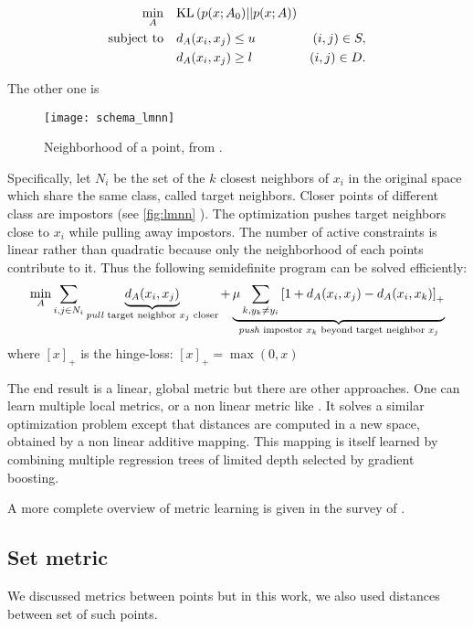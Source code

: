 \begin{align*}
	\min_A &\quad \mathrm{KL}\left(p(x; A_0)||p(x; A)\right) &\quad\\
	\text{subject to} &\quad d_A(x_i, x_j) \leq u &(i,j) \in S,\\
 &\quad d_A(x_i, x_j) \geq l &(i,j) \in D.
\end{align*}

The other one is  \autocite{LMNN09}
\begin{figure}[ht]
	\texttt{[image: schema\_lmnn]}
	\caption{Neighborhood of a point, from \autocite{LMNN09}.\label{fig:lmnn}}
\end{figure}
Specifically, let $N_i$ be the set of the $k$ closest neighbors of $x_i$ in the
original space which share the same class, called target neighbors. Closer
points of different class are impostors (see \autoref{fig:lmnn}
). The optimization pushes target neighbors close to $x_i$
while pulling away impostors. The number of active constraints is linear
rather than quadratic because only the neighborhood of each points contribute
to it. Thus the following semidefinite program can be solved efficiently:
\begin{equation*}
	\min_A \sum_{i, j\in N_i}
	\underbrace{d_A(x_i, x_j)}_\text{\emph{pull} target neighbor $x_j$ closer} +
	\underbrace{\mu \sum_{k, y_k\neq y_i} \left[ 1 + d_A(x_i, x_j) -
	d_A(x_i, x_k)\right]_+}_\text{\emph{push} impostor $x_k$ beyond target
	neighbor $x_j$}
\end{equation*}
where $[x]_+$ is the hinge-loss: $[x]_+=\max(0, x)$

The end result is a linear, global metric but there are other approaches. One
can learn multiple local metrics, or a non linear metric like
 \autocite{GBLMNN12}. It solves a similar
optimization problem except that distances are computed in a new space,
obtained by a non linear additive mapping. This mapping is itself learned by
combining multiple regression trees of limited depth selected by gradient
boosting.

A more complete overview of metric learning is given in the survey of
\textcite{MetricSurvey13}.

\subsection{Set metric}

We discussed metrics between points but in this work, we also used distances
between set of such points.

